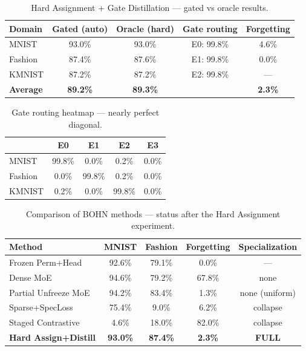 \begin{table}[h]
\centering
\caption{Hard Assignment + Gate Distillation --- gated vs oracle results.}
\begin{tabular}{l c c c c}
\hline
\textbf{Domain} & \textbf{Gated (auto)} & \textbf{Oracle (hard)} & \textbf{Gate routing} & \textbf{Forgetting} \\
\hline
MNIST & 93.0\% & 93.0\% & E0: 99.8\% & 4.6\% \\
Fashion & 87.4\% & 87.6\% & E1: 99.8\% & 0.0\% \\
KMNIST & 87.2\% & 87.2\% & E2: 99.8\% & --- \\
\textbf{Average} & \textbf{89.2\%} & \textbf{89.3\%} & & \textbf{2.3\%} \\
\hline
\end{tabular}
\end{table}

\begin{table}[h]
\centering
\caption{Gate routing heatmap --- nearly perfect diagonal.}
\begin{tabular}{l c c c c}
\hline
& \textbf{E0} & \textbf{E1} & \textbf{E2} & \textbf{E3} \\
\hline
MNIST & 99.8\% & 0.0\% & 0.2\% & 0.0\% \\
Fashion & 0.0\% & 99.8\% & 0.2\% & 0.0\% \\
KMNIST & 0.2\% & 0.0\% & 99.8\% & 0.0\% \\
\hline
\end{tabular}
\end{table}

\begin{table}[h]
\centering
\caption{Comparison of BOHN methods --- status after the Hard Assignment experiment.}
\begin{tabular}{l c c c c}
\hline
\textbf{Method} & \textbf{MNIST} & \textbf{Fashion} & \textbf{Forgetting} & \textbf{Specialization} \\
\hline
Frozen Perm+Head & 92.6\% & 79.1\% & 0.0\% & --- \\
Dense MoE & 94.6\% & 79.2\% & 67.8\% & none \\
Partial Unfreeze MoE & 94.2\% & 83.4\% & 1.3\% & none (uniform) \\
Sparse+SpecLoss & 75.4\% & 9.0\% & 6.2\% & collapse \\
Staged Contrastive & 4.6\% & 18.0\% & 82.0\% & collapse \\
\textbf{Hard Assign+Distill} & \textbf{93.0\%} & \textbf{87.4\%} & \textbf{2.3\%} & \textbf{FULL} \\
\hline
\end{tabular}
\end{table}

